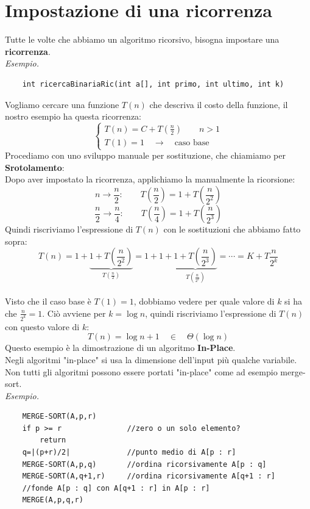 \section{Impostazione di una ricorrenza}
Tutte le volte che abbiamo un algoritmo ricorsivo, bisogna impostare una \textbf{ricorrenza}.\smallskip\\
\textit{Esempio.}
\begin{verbatim}
    int ricercaBinariaRic(int a[], int primo, int ultimo, int k)
\end{verbatim}
Vogliamo cercare una funzione $T(n)$ che descriva il costo della funzione, il nostro esempio ha questa ricorrenza:
$$\begin{cases}
   \displaystyle T(n)= C+T\left(\frac{n}{2}\right) \qquad n>1 \\
    T(1) = 1 \quad \to \quad \text{caso base} 
\end{cases}$$
Procediamo con uno sviluppo manuale per sostituzione, che chiamiamo per \textbf{Srotolamento}:\\
Dopo aver impostato la ricorrenza, applichiamo la manualmente la ricorsione:
$$n\to \frac{n}{2} :\qquad T\left(\frac{n}{2} \right) = 1 + T\left( \frac{n}{2^2} \right) $$
$$\frac{n}{2}\to \frac{n}{4}:\qquad T\left(\frac{n}{4} \right) = 1+ T\left( \frac{n}{2^3} \right)$$
Quindi riscriviamo l'espressione di $T(n)$ con le sostituzioni che abbiamo fatto sopra:
$$T(n) = 1+\underbrace{1+T\left(\frac{n}{2^2}\right)}_{ \displaystyle T\left(\frac{n}{2}\right)} = 1+1+\underbrace{1+ T\left( \frac{n}{2^3} \right)}_{\displaystyle T\left( \frac{n}{2^2}\right)} = \cdots =  \boxed{ K + T \frac{n}{2^k}}$$\\
Visto che il caso base è $T(1) = 1$, dobbiamo vedere per quale valore di $k$ si ha che $ \frac{n}{2^k} = 1$. Ciò avviene per $k = \log n$, quindi riscriviamo l'espressione di $T(n)$ con questo valore di $k$:
$$T(n)=\log n+1 \quad \in \quad \Theta(\log n)$$
Questo esempio è la dimostrazione di un algoritmo \textbf{In-Place}.\\
Negli algoritmi "in-place" si usa la dimensione dell'input più qualche variabile. Non tutti gli algoritmi possono essere portati "in-place" come ad esempio merge-sort.\bigskip\\

\noindent \textit{Esempio.}

\begin{verbatim}
    MERGE-SORT(A,p,r)
    if p >= r               //zero o un solo elemento?
        return
    q=|(p+r)/2|             //punto medio di A[p : r]
    MERGE-SORT(A,p,q)       //ordina ricorsivamente A[p : q]
    MERGE-SORT(A,q+1,r)     //ordina ricorsivamente A[q+1 : r]
    //fonde A[p : q] con A[q+1 : r] in A[p : r]
    MERGE(A,p,q,r)
\end{verbatim}

